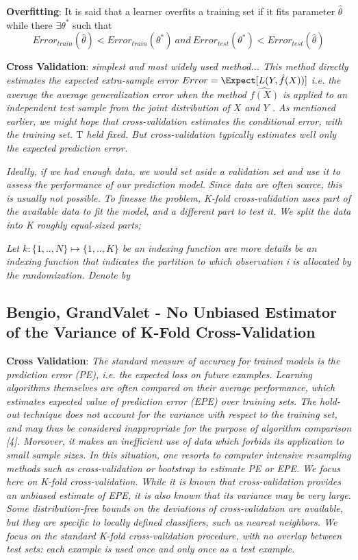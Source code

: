 \textbf{Overfitting}: 
It is said that a learner overfits a training set  if it fits parameter $\hat{\theta}$ while there $\exists \theta^*$ such that
\begin{equation} \label{eq:overfitting}
Error_{train}(\hat{\theta}) < Error_{train}(\theta^*) \  and \ Error_{test}(\theta^*) < Error_{test}(\hat{\theta})   
\end{equation}

\textbf{Cross Validation}:  
\textit{simplest and most widely used method... This method directly estimates the expected extra-sample error
$Error = \Expect[L(Y,\hat{f}(X))] $ i.e. the average the average generalization error when the method $\hat{f(X)}$ is applied to an independent test sample from the joint distribution of $X$ and $Y$ . As mentioned earlier, we might hope that cross-validation estimates the conditional error, with the training set. $\mathrm{T}$ held fixed. But cross-validation typically estimates well only the expected prediction error.}

\textit{Ideally, if we had enough data, we would set aside a validation set and use it to assess the performance of our prediction model. Since data are often scarce, this is usually not possible. To finesse the problem, K-fold cross-validation uses part of the available data to fit the model, and a different part to test it. We split the data into K roughly equal-sized parts; }

\textit{Let $k : \{1,..,N\} \mapsto \{1, .., K\}$ be an indexing function are more details be an indexing
function that indicates the partition to which observation i is allocated by the randomization. Denote by}


\subsection{Bengio, GrandValet - No Unbiased Estimator of the Variance of K-Fold Cross-Validation}
\textbf{Cross Validation}: 
\textit{The standard measure of accuracy for trained models is the prediction error (PE), i.e. the expected loss on future examples. Learning algorithms themselves are often compared on their average performance, which estimates expected value of prediction error (EPE) over training sets.
The hold-out technique does not account for the variance with respect to the training set, and may thus be considered inappropriate for the purpose of algorithm comparison [4]. Moreover, it makes an inefficient use of data which forbids its application to small sample sizes. In this situation, one resorts to computer intensive resampling methods such as cross-validation or bootstrap to estimate PE or EPE. We focus here on K-fold cross-validation. While it is known that cross-validation provides an unbiased estimate of EPE, it is also known that its variance may be very large.
Some distribution-free bounds on the deviations of cross-validation are available, but they are specific to locally defined classifiers, such as nearest neighbors.
We focus on the standard K-fold cross-validation procedure, with no overlap between test sets: each example is used once and only once as a test example.
}



